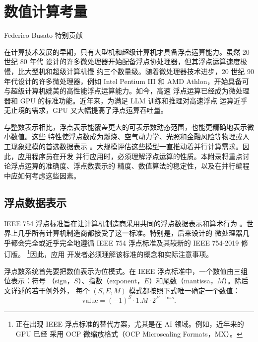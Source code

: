 \chapter{数值计算考量}
\chaptercontents
\label{app:numerical-considerations}

\begin{center}
  \small Federico Busato 特别贡献
\end{center}

在计算技术发展的早期，只有大型机和超级计算机才具备浮点运算能力。虽然 20 世纪 80 年代
设计的许多微处理器开始配备浮点协处理器，但其浮点运算速度极慢，比大型机和超级计算机慢
约三个数量级。随着微处理器技术进步，20 世纪 90 年代设计的许多微处理器，例如 Intel
Pentium III 和 AMD Athlon，开始具备可与超级计算机媲美的高性能浮点运算能力。如今，高速
浮点运算已经成为微处理器和 GPU 的标准功能。近年来，为满足 LLM 训练和推理对高速浮点
运算近乎无止境的需求，GPU 又大幅提高了浮点运算吞吐量。

与整数表示相比，浮点表示能覆盖更大的可表示数动态范围，也能更精确地表示微小数值。这些
特性使浮点数成为燃烧、空气动力学、光照和金融风险等物理或人工现象建模的首选数据表示
\cite{appa-goldberg}。大规模评估这些模型一直推动着并行计算需求。因此，应用程序员在开发
并行应用时，必须理解浮点运算的性质。本附录将重点讨论浮点运算的准确度、浮点数表示的
精度、数值算法的稳定性，以及在并行编程中应如何考虑这些因素。

\section{浮点数据表示}
\label{sec:appa-floating-point-representation}

IEEE 754 浮点标准旨在让计算机制造商采用共同的浮点数据表示和算术行为
\cite{appa-ieee754}。世界上几乎所有计算机制造商都接受了这一标准。特别是，后来设计的
微处理器几乎都会完全或近乎完全地遵循 IEEE 754 浮点标准及其较新的 IEEE 754-2019 修订版。
\footnote{正在出现 IEEE 浮点标准的替代方案，尤其是在 AI 领域。例如，近年来的 GPU 已经
采用 OCP 微缩放格式（OCP Microscaling Formats，MX）\cite{appa-ocp-mx}。}因此，应用
开发者必须理解该标准的概念和实际注意事项。

浮点数系统首先要把数值表示为位模式。在 IEEE 浮点标准中，一个数值由三组位表示：符号
（sign，$S$）、指数（exponent，$E$）和尾数（mantissa，$M$）。除后文详述的若干例外外，
每个 $(S,E,M)$ 模式都按照下式唯一确定一个数值：
\begin{equation}
  \text{value}=(-1)^S\cdot 1.M\cdot 2^{E-\text{bias}}.
  \label{eq:appa-value}
\end{equation}

